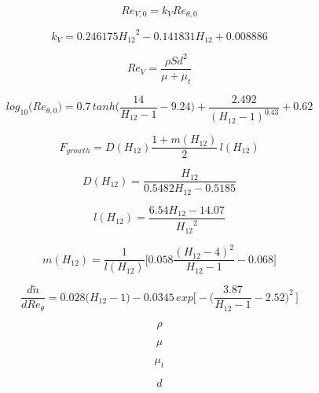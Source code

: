 \begin{equation}
Re_{V,0} = k_V Re_{\theta,0}
\end{equation}

\begin{equation}
k_V = 0.246175{H_{12}}^2 - 0.141831 H_{12} + 0.008886
\end{equation}

\begin{equation}
Re_{V} = \frac{\rho S d^2}{\mu + \mu_t}
\end{equation}

\begin{equation}
{log}_{10} \Big(Re_{\theta ,0} \Big) = 0.7 \, {tanh} \bigg(\frac{14}{H_{12} - 1} - 9.24 \bigg) + \frac{2.492}{(H_{12} - 1)^{0.43}} + 0.62
\end{equation}

\begin{equation}
F_{growth} = D (H_{12}) \frac{1 + m(H_{12})}{2} \, l({H_{12}})
\end{equation}

\begin{equation}
D(H_{12}) = \frac{H_{12}}{0.5482 H_{12} - 0.5185}
\end{equation}

\begin{equation}
l(H_{12}) = \frac{6.54 H_{12} - 14.07}{{H_{12}}^2}
\end{equation}

\begin{equation}
m(H_{12}) = \frac{1}{l(H_{12})} \bigg[0.058 \frac{(H_{12} - 4)^2}{H_{12} - 1} - 0.068 \bigg]
\end{equation}

\begin{equation}
\frac{d \tilde{n}}{d Re_{\theta}} = 0.028 \Big( H_{12} - 1 \Big) - 0.0345 \, {exp} \bigg[- \bigg(\frac{3.87}{H_{12}-1} - 2.52 \bigg)^2 \, \bigg]
\end{equation}

\begin{equation}
\rho
\end{equation}

\begin{equation}
\mu
\end{equation}

\begin{equation}
\mu_t
\end{equation}

\begin{equation}
d
\end{equation}

